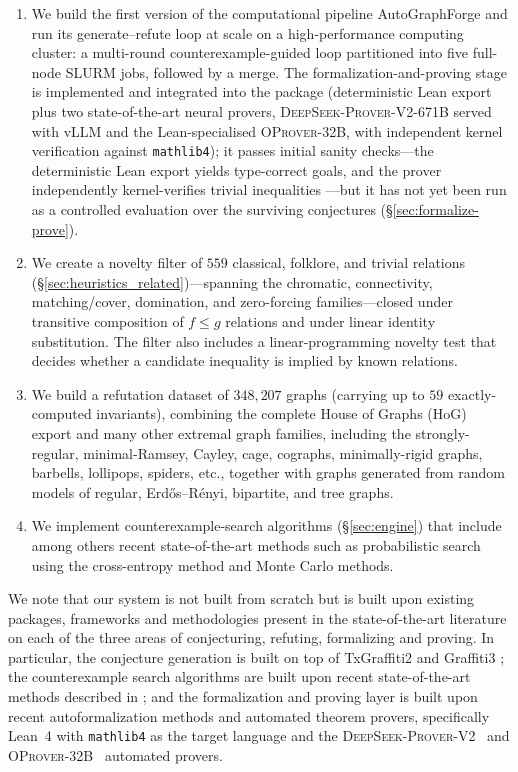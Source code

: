 \documentclass[]{ceurart}
\begin{document}
\begin{enumerate}
  \item We build the first version of the computational pipeline \textsf{AutoGraphForge} and run its generate--refute loop at scale on a high-performance computing
  cluster: a multi-round counterexample-guided loop partitioned into five full-node SLURM jobs, followed by a merge. The formalization-and-proving
  stage is implemented and integrated into the
  package (deterministic Lean export plus two state-of-the-art neural provers,
  \textsc{DeepSeek-Prover-V2-671B} served with vLLM and the Lean-specialised \textsc{OProver-32B}, with
  independent kernel verification against \texttt{mathlib4}); it passes initial sanity checks---the deterministic Lean export yields type-correct goals, and the
  prover independently kernel-verifies trivial
  inequalities ---but it has not yet been run as a controlled
  evaluation over the surviving conjectures (\S\ref{sec:formalize-prove}).
  \item We create a novelty filter of $559$ classical, folklore, and trivial relations
  (\S\ref{sec:heuristics_related})---spanning the chromatic, connectivity,
  matching/cover, domination, and zero-forcing families---closed under transitive composition of $f\le g$
  relations and under linear identity substitution. The filter also includes a linear-programming novelty test that decides whether a candidate inequality is implied by known relations.
  \item We build a refutation dataset of $348{,}207$ graphs (carrying up to
  $59$ exactly-computed invariants), combining the complete House of Graphs (HoG)~\cite{coolsaet2023house} export and many other extremal graph families, including the strongly-regular, minimal-Ramsey,
  Cayley, cage, cographs, minimally-rigid graphs, barbells, lollipops, spiders, etc., together with graphs generated from random models of regular, Erd\H{o}s--R\'enyi, bipartite, and tree graphs. 
  \item We implement counterexample-search algorithms 
    (\S\ref{sec:engine}) that include among others recent state-of-the-art methods such as probabilistic search using the cross-entropy method and Monte Carlo methods.
\end{enumerate}

We note that our system is not built from scratch but is built upon existing packages, frameworks and methodologies present in the state-of-the-art literature on each of the three areas of conjecturing, refuting, formalizing and proving. In particular, the conjecture generation is built on top of TxGraffiti2 \cite{davila2024automated} and Graffiti3 \cite{davila2026graffiti3}; the counterexample search algorithms are built upon recent state-of-the-art methods described in \cite{jooken2025computer,wagner2021constructions}; and the formalization and proving layer is built upon recent autoformalization methods and automated theorem provers, specifically Lean~4 with \texttt{mathlib4} as the target language and the \textsc{DeepSeek-Prover-V2}~\cite{deepseek2025prover} and \textsc{OProver-32B}~\cite{oprover2026} automated provers.
\end{document}
